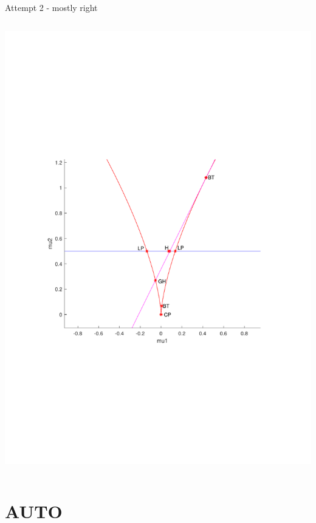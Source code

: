 \documentclass{beamer}
\begin{document}
\begin{frame}[label={sec:org9f2aa25}]{Attempt 2 - mostly right}
\begin{columns}
\begin{column}{0.6\columnwidth}
\begin{center}
\includegraphics[trim={4cm 8cm 3cm 9cm}, clip,height=.8\textheight]{krassV2.pdf}
\end{center}
\end{column}
\end{columns}
\end{frame}
\section{AUTO}
\label{sec:orgbe31537}
\end{document}
